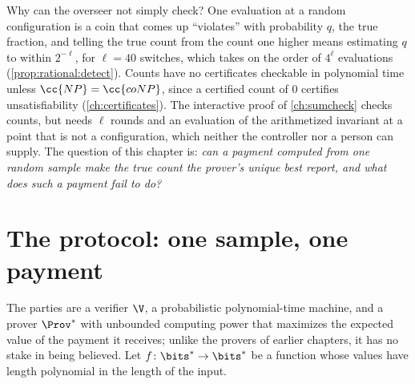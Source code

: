 \begin{refsection}
Why can the overseer not simply check? One evaluation at a random configuration is a coin that comes up ``violates'' with probability $q$, the true fraction, and telling the true count from the count one higher means estimating $q$ to within $2^{-\ell}$, for $\ell=40$ switches, which takes on the order of $4^{\ell}$ evaluations (\cref{prop:rational:detect}). Counts have no certificates checkable in polynomial time unless $\cc{NP}=\cc{coNP}$, since a certified count of $0$ certifies unsatisfiability (\cref{ch:certificates}). The interactive proof of \cref{ch:sumcheck} checks counts, but needs $\ell$ rounds and an evaluation of the arithmetized invariant at a point that is not a configuration, which neither the controller nor a person can supply. The question of this chapter is: \emph{can a payment computed from one random sample make the true count the prover's unique best report, and what does such a payment fail to do?}

\section{The protocol: one sample, one payment}\label{sec:rational:protocol}

The parties are a verifier $\V$, a probabilistic polynomial-time machine, and a prover $\Prov^*$ with unbounded computing power that maximizes the expected value of the payment it receives; unlike the provers of earlier chapters, it has no stake in being believed. Let $f\colon\bits^*\to\bits^*$ be a function whose values have length polynomial in the length of the input.



\end{refsection}
